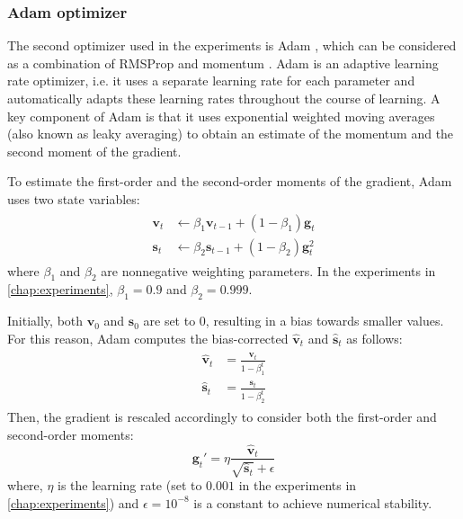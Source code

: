 \subsubsection{Adam optimizer}
\label{sec:adam_opt}
The second optimizer used in the experiments is Adam \cite{kingma2014adam}, which can be considered as a combination of RMSProp \cite{hinton2012neural} and momentum \cite{sutskever2013importance}. Adam is an adaptive learning rate optimizer, i.e. it uses a separate learning rate for each parameter and automatically adapts these learning rates throughout the course of learning. A key component of Adam is that it uses exponential weighted moving averages (also known as leaky averaging) to obtain an estimate of the momentum and the second moment of the gradient.

To estimate the first-order and the second-order moments of the gradient, Adam uses two state variables:
\begin{equation}
    \begin{split}\begin{aligned}
        \mathbf{v}_t & \leftarrow \beta_1 \mathbf{v}_{t-1} + (1 - \beta_1) \mathbf{g}_t \\
        \mathbf{s}_t & \leftarrow \beta_2 \mathbf{s}_{t-1} + (1 - \beta_2) \mathbf{g}_t^2
    \end{aligned}\end{split}
\end{equation}
where $\beta_1$ and $\beta_2$ are nonnegative weighting parameters. In the experiments in \autoref{chap:experiments}, $\beta_1=0.9$ and $\beta_2=0.999$.

Initially, both $\mathbf{v}_0$ and $\mathbf{s}_0$ are set to 0, resulting in a bias towards smaller values. For this reason, Adam computes the bias-corrected $\hat{\mathbf{v}}_t$ and $\hat{\mathbf{s}}_t$ as follows:
\begin{equation}
    \begin{split}\begin{aligned}
        \hat{\mathbf{v}}_t & = \frac{\mathbf{v}_t}{1 - \beta_1^t} \\
        \hat{\mathbf{s}}_t & = \frac{\mathbf{s}_t}{1 - \beta_2^t}
    \end{aligned}\end{split}
\end{equation}
Then, the gradient is rescaled accordingly to consider both the first-order and second-order moments:
\begin{equation}
    \mathbf{g}_t' = \eta \frac{ \hat{\mathbf{v}}_t}{\sqrt{\hat{\mathbf{s}}_t} + \epsilon}
\end{equation}
where, $\eta$ is the learning rate (set to $0.001$ in the experiments in \autoref{chap:experiments}) and $\epsilon = 10^{-8}$ is a constant to achieve numerical stability.

